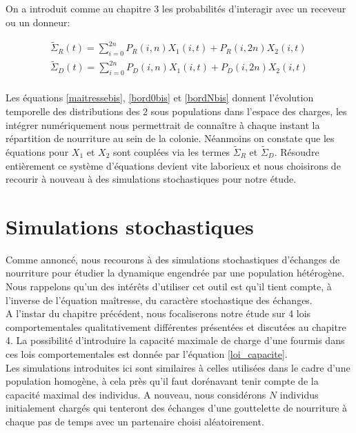 On a introduit comme au chapitre 3 les probabilités d'interagir avec un receveur ou un donneur:

\begin{equation}
\begin{aligned}
\tilde{\Sigma}_R(t) = \sum_{i=0}^{2n} P_R(i,n) X_1(i,t)+ P_R(i,2n) X_2(i,t)\\
\tilde{\Sigma}_D(t) = \sum_{i=0}^{2n} P_D(i,n) X_1(i,t)+ P_D(i,2n) X_2(i,t)\\			
\end{aligned}
\end{equation}

Les équations \ref{maitressebis}, \ref{bord0bis} et \ref{bordNbis} donnent l'évolution temporelle des distributions des 2 sous populations dans l'espace des charges, les intégrer numériquement nous permettrait de connaître à chaque instant la répartition de nourriture au sein de la colonie. Néanmoins on constate que les équations pour $X_1$ et $X_2$ sont couplées via les termes $\tilde{\Sigma}_R$ et $\tilde{\Sigma}_D$. Résoudre entièrement ce système d'équations devient vite laborieux et nous choisirons de recourir à nouveau à des simulations stochastiques pour notre étude.

\section{Simulations stochastiques}

Comme annoncé, nous recourons à des simulations stochastiques d'échanges de nourriture pour étudier la dynamique engendrée par une population hétérogène. Nous rappelons qu'un des intérêts d'utiliser cet outil est qu'il tient compte, à l'inverse de l'équation maîtresse, du caractère stochastique des échanges. \\

A l'instar du chapitre précédent, nous focaliserons notre étude sur 4 lois comportementales qualitativement différentes présentées et discutées au chapitre 4. La possibilité d'introduire la capacité maximale de charge d'une fourmis dans ces lois comportementales est donnée par l'équation \ref{loi_capacite}. \\ 

Les simulations introduites ici sont similaires à celles utilisées dans le cadre d'une population homogène, à cela près qu'il faut dorénavant tenir compte de la capacité maximal des individus. A nouveau, nous considérons $N$ individus initialement chargés qui tenteront des échanges d'une gouttelette de nourriture à chaque pas de temps avec un partenaire choisi aléatoirement.\\

